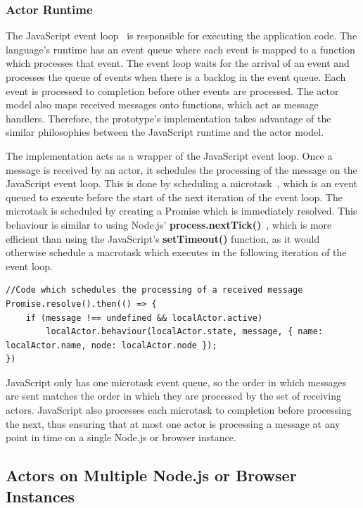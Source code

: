 \documentclass[lettersize,journal]{IEEEtran}
\begin{document}
\subsubsection{Actor Runtime}
The JavaScript event loop~\cite{eventloopbrowser, eventloopnode} is responsible for executing the application code. The language's runtime has an event queue where each event is mapped to a function which processes that event. The event loop waits for the arrival of an event and processes the queue of events when there is a backlog in the event queue. Each event is processed to completion before other events are processed. The actor model also maps received messages onto functions, which act as message handlers. Therefore, the prototype's implementation takes advantage of the similar philosophies between the JavaScript runtime and the actor model.

The implementation acts as a wrapper of the JavaScript event loop. Once a message is received by an actor, it schedules the processing of the message on the JavaScript event loop. This is done by scheduling a microtask~\cite{microtasks}, which is an event queued to execute before the start of the next iteration of the event loop. The microtask is scheduled by creating a Promise which is immediately resolved. This behaviour is similar to using Node.js' \textbf{process.nextTick()}~\cite{nexttick}, which is more efficient than using the JavaScript's \textbf{setTimeout()} function, as it would otherwise schedule a macrotask which executes in the following iteration of the event loop.
\begin{lstlisting}
//Code which schedules the processing of a received message
Promise.resolve().then(() => {
    if (message !== undefined && localActor.active)
        localActor.behaviour(localActor.state, message, { name: localActor.name, node: localActor.node });
})
\end{lstlisting}
JavaScript only has one microtask event queue, so the order in which messages are sent matches the order in which they are processed by the set of receiving actors. JavaScript also processes each microtask to completion before processing the next, thus ensuring that at most one actor is processing a message at any point in time on a single Node.js or browser instance.
\subsection{Actors on Multiple Node.js or Browser Instances}
\end{document}
